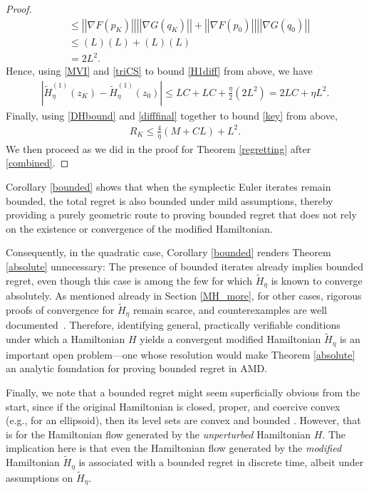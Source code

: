 \documentclass[11pt]{article}
\newcommand{\lnorm}{\left|\left|}
\newcommand{\rnorm}{\right|\right|}
\begin{document}
\begin{proof}
\begin{align}
    &\leq \lnorm\nabla F(p_K)\rnorm\lnorm\nabla G(q_K)\rnorm+\lnorm\nabla F(p_0)\rnorm\lnorm\nabla G(q_0)\rnorm\nonumber\\
    &\leq (L)(L)+(L)(L)\nonumber\\
    &=2L^2.\label{triCS}
\end{align}
Hence, using \eqref{MVI} and \eqref{triCS} to bound \eqref{H1diff} from above, we have
\begin{gather}
    \left|\widetilde H^{(1)}_{\eta}(z_K)-\widetilde H^{(1)}_{\eta}(z_0)\right|\leq LC+LC+\frac{\eta}{2}\left(2L^{2}\right)=2LC+\eta L^{2}.\label{difffinal}
\end{gather}
Finally, using \eqref{DHbound} and \eqref{difffinal} together to bound \eqref{key} from above, 
\begin{gather*}
    \boxed{R_{K}\leq\frac{4}{\eta}\left(M+CL\right)+L^{2}.}
\end{gather*}
We then proceed as we did in the proof for Theorem \ref{regretting} after \eqref{combined}.
\end{proof}
Corollary \ref{bounded} shows that when the symplectic Euler iterates remain bounded, the total regret is also bounded under mild assumptions, thereby providing a purely geometric route to proving bounded regret that does not rely on the existence or convergence of the modified Hamiltonian.

Consequently, in the quadratic case, Corollary \ref{bounded} renders Theorem \ref{absolute} unnecessary: The presence of bounded iterates already implies bounded regret, even though this case is among the few for which $\widetilde{H}_{\eta}$ is known to converge absolutely. As mentioned already in Section \ref{MH_more}, for other cases, rigorous proofs of convergence for $\widetilde{H}_{\eta}$ remain scarce, and counterexamples are well documented~\citep{Suris1989,Field2003,Alsallami2018}. Therefore, identifying general, practically verifiable conditions under which a Hamiltonian $H$ yields a convergent modified Hamiltonian $\widetilde{H}_{\eta}$ is an important open problem---one whose resolution would make Theorem \ref{absolute} an analytic foundation for proving bounded regret in AMD.

Finally, we note that a bounded regret might seem superficially obvious from the start, since if the original Hamiltonian is closed, proper, and coercive convex (e.g., for an ellipsoid), 
then its level sets are convex and bounded 
\citep[Section 8]{Rockafellar1996}. However, that is for the Hamiltonian flow generated by the \textit{unperturbed} Hamiltonian $H$. The implication here is that even the Hamiltonian flow generated by the \textit{modified} Hamiltonian $\widetilde{H}_{\eta}$ is associated with a bounded regret in discrete time, albeit under assumptions on $\widetilde{H}_{\eta}$. 
\end{document}
